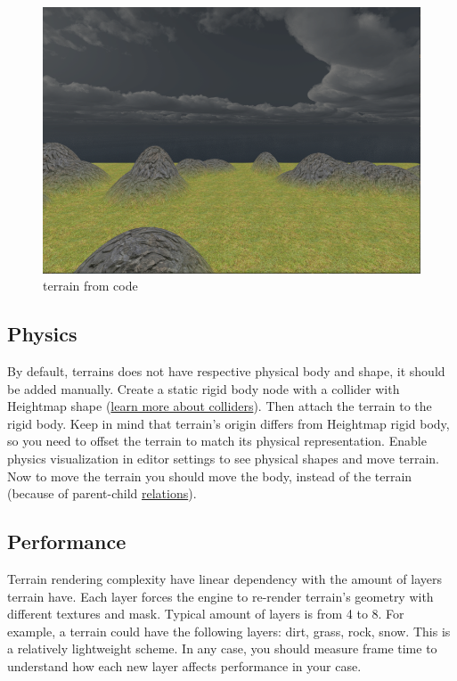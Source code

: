 \documentclass[
]{book}
\theoremstyle{definition}
\theoremstyle{definition}
\theoremstyle{definition}
\theoremstyle{definition}
\theoremstyle{remark}
\begin{document}
\begin{figure}
\centering
\includegraphics{images/scene_terrain_random.png}
\caption{terrain from code}
\end{figure}

\subsection{Physics}\label{physics-1}

By default, terrains does not have respective physical body and shape, it should be added manually. Create a static rigid body node with a collider with Heightmap shape (\href{../physics/collider.md}{learn more about colliders}). Then attach the terrain to the rigid body. Keep in mind that terrain's origin differs from Heightmap rigid body, so you need to offset the terrain to match its physical representation. Enable physics visualization in editor settings to see physical shapes and move terrain. Now to move the terrain you should move the body, instead of the terrain (because of parent-child \href{../beginning/scene_and_scene_graph.md\#local-and-global-coordinates}{relations}).

\subsection{Performance}\label{performance-4}

Terrain rendering complexity have linear dependency with the amount of layers terrain have. Each layer forces the engine to re-render terrain's geometry with different textures and mask. Typical amount of layers is from 4 to 8. For example, a terrain could have the following layers: dirt, grass, rock, snow. This is a relatively lightweight scheme. In any case, you should measure frame time to understand how each new layer affects performance in your case.
\end{document}
